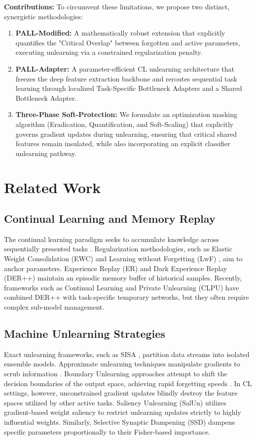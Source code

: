\documentclass[conference]{IEEEtran}
\theoremstyle{plain}
\theoremstyle{definition}
\theoremstyle{remark}
\begin{document}
\textbf{Contributions:} To circumvent these limitations, we propose two distinct, synergistic methodologies:
\begin{enumerate}
    \item \textbf{PALL-Modified:} A mathematically robust extension that explicitly quantifies the "Critical Overlap" between forgotten and active parameters, executing unlearning via a constrained regularization penalty.
    \item \textbf{PALL-Adapter:} A parameter-efficient CL unlearning architecture that freezes the deep feature extraction backbone and reroutes sequential task learning through localized Task-Specific Bottleneck Adapters and a Shared Bottleneck Adapter.
    \item \textbf{Three-Phase Soft-Protection:} We formulate an optimization masking algorithm (Eradication, Quantification, and Soft-Scaling) that explicitly governs gradient updates during unlearning, ensuring that critical shared features remain insulated, while also incorporating an explicit classifier unlearning pathway.
\end{enumerate}

\section{Related Work}

\subsection{Continual Learning and Memory Replay}
The continual learning paradigm seeks to accumulate knowledge across sequentially presented tasks \cite{thrun1995lifelong}. Regularization methodologies, such as Elastic Weight Consolidation (EWC) \cite{kirkpatrick2017overcoming} and Learning without Forgetting (LwF) \cite{li2017learning}, aim to anchor parameters. Experience Replay (ER) and Dark Experience Replay (DER++) \cite{buzzega2020dark} maintain an episodic memory buffer of historical samples. Recently, frameworks such as Continual Learning and Private Unlearning (CLPU) \cite{liu2022clpu} have combined DER++ with task-specific temporary networks, but they often require complex sub-model management.

\subsection{Machine Unlearning Strategies}
Exact unlearning frameworks, such as SISA \cite{bourtoule2021machine}, partition data streams into isolated ensemble models. Approximate unlearning techniques manipulate gradients to scrub information \cite{golatkar2020forgetting}. Boundary Unlearning approaches attempt to shift the decision boundaries of the output space, achieving rapid forgetting speeds \cite{chen2023boundary}. In CL settings, however, unconstrained gradient updates blindly destroy the feature spaces utilized by other active tasks. Saliency Unlearning (SalUn) \cite{fan2024salun} utilizes gradient-based weight saliency to restrict unlearning updates strictly to highly influential weights. Similarly, Selective Synaptic Dampening (SSD) \cite{foster2024ssd} dampens specific parameters proportionally to their Fisher-based importance.
\end{document}
